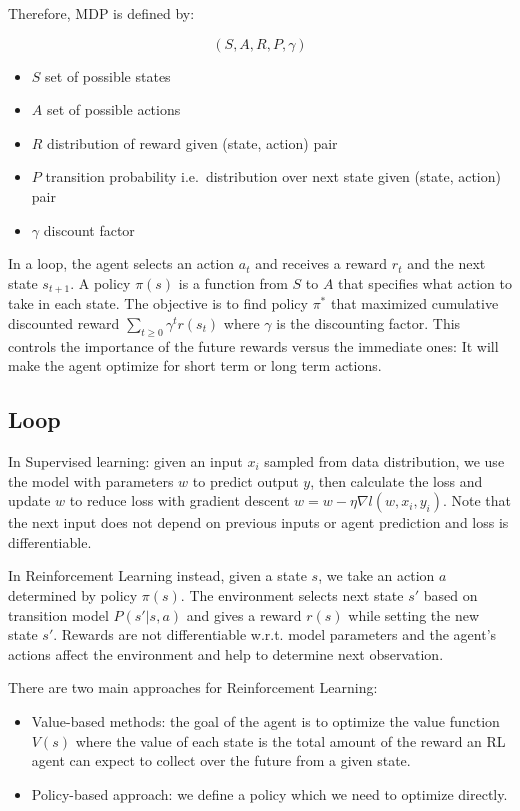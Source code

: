 \documentclass{article}
\begin{document}
Therefore, MDP is defined by:

\[(S, A, R, P, \gamma)\]

\begin{itemize}
\tightlist
\item
  \(S\) set of possible states
\item
  \(A\) set of possible actions
\item
  \(R\) distribution of reward given (state, action) pair
\item
  \(P\) transition probability i.e.~distribution over next state given
  (state, action) pair
\item
  \(\gamma\) discount factor
\end{itemize}

In a loop, the agent selects an action \(a_t\) and receives a reward
\(r_t\) and the next state \(s_{t+1}\). A policy \(\pi(s)\) is a
function from \(S\) to \(A\) that specifies what action to take in each
state. The objective is to find policy \(\pi^*\) that maximized
cumulative discounted reward \(\sum_{t\ge 0}\gamma^t r(s_t)\) where
\(\gamma\) is the discounting factor. This controls the importance of
the future rewards versus the immediate ones: It will make the agent
optimize for short term or long term actions.

\subsection{Loop}\label{loop}

In Supervised learning: given an input \(x_i\) sampled from data
distribution, we use the model with parameters \(w\) to predict output
\(y\), then calculate the loss and update \(w\) to reduce loss with
gradient descent \(w = w-\eta \nabla l(w, x_i, y_i)\). Note that the
next input does not depend on previous inputs or agent prediction and
loss is differentiable.

In Reinforcement Learning instead, given a state \(s\), we take an
action \(a\) determined by policy \(\pi(s)\). The environment selects
next state \(s'\) based on transition model \(P(s'|s, a)\) and gives a
reward \(r(s)\) while setting the new state \(s'\). Rewards are not
differentiable w.r.t. model parameters and the agent's actions affect
the environment and help to determine next observation.

There are two main approaches for Reinforcement Learning:

\begin{itemize}
\tightlist
\item
  Value-based methods: the goal of the agent is to optimize the value
  function \(V(s)\) where the value of each state is the total amount of
  the reward an RL agent can expect to collect over the future from a
  given state.
\item
  Policy-based approach: we define a policy which we need to optimize
  directly.
\end{itemize}
\end{document}
